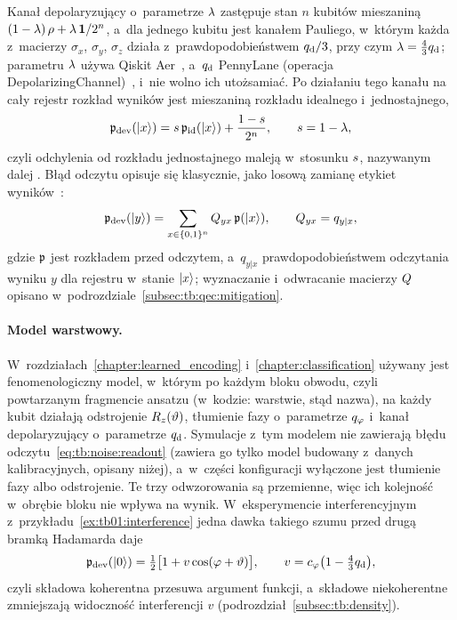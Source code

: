 Kanał depolaryzujący o~parametrze $\lambda$ zastępuje stan $n$ kubitów mieszaniną $(1-\lambda)\,\rho+\lambda\,\mathbf{1}/2^n$, a~dla jednego kubitu jest kanałem Pauliego, w~którym każda z~macierzy $\sigma_x$, $\sigma_y$, $\sigma_z$ działa z~prawdopodobieństwem $q_{\mathrm{d}}/3$, przy czym $\lambda=\tfrac{4}{3}q_{\mathrm{d}}$; parametru $\lambda$ używa Qiskit Aer~\cite{qiskit_aer_noise_docs_2026}, a~$q_{\mathrm{d}}$ PennyLane (operacja DepolarizingChannel)~\cite{bergholm_pennylane_2018}, i~nie wolno ich utożsamiać.
Po działaniu tego kanału na cały rejestr rozkład wyników jest mieszaniną rozkładu idealnego i~jednostajnego,
\begin{equation}\label{eq:tb:noise:shrink}
\mathfrak{p}_{\mathrm{dev}}(\ket{x})=s\,\mathfrak{p}_{\mathrm{id}}(\ket{x})+\frac{1-s}{2^n},\qquad s=1-\lambda,
\end{equation}
czyli odchylenia od rozkładu jednostajnego maleją w~stosunku $s$, nazywanym dalej .
Błąd odczytu opisuje się klasycznie, jako losową zamianę etykiet wyników~\cite{maciejewski_mitigation_2020}:
\begin{equation}\label{eq:tb:noise:readout}
\mathfrak{p}_{\mathrm{dev}}(\ket{y})=\sum_{x\in\{0,1\}^n}Q_{yx}\,\mathfrak{p}(\ket{x}),\qquad Q_{yx}=q_{y|x},
\end{equation}
gdzie $\mathfrak{p}$ jest rozkładem przed odczytem, a~$q_{y|x}$ prawdopodobieństwem odczytania wyniku $y$ dla rejestru w~stanie $\ket{x}$; wyznaczanie i~odwracanie macierzy $Q$ opisano w~podrozdziale~\ref{subsec:tb:qec:mitigation}.

\paragraph{Model warstwowy.}
W~rozdziałach~\ref{chapter:learned_encoding} i~\ref{chapter:classification} używany jest fenomenologiczny model, w~którym po każdym bloku obwodu, czyli powtarzanym fragmencie ansatzu (w~kodzie: warstwie, stąd nazwa), na każdy kubit działają odstrojenie $R_z(\vartheta)$, tłumienie fazy o~parametrze $q_{\varphi}$ i~kanał depolaryzujący o~parametrze $q_{\mathrm{d}}$.
Symulacje z~tym modelem nie zawierają błędu odczytu~\eqref{eq:tb:noise:readout} (zawiera go tylko model budowany z~danych kalibracyjnych, opisany niżej), a~w~części konfiguracji wyłączone jest tłumienie fazy albo odstrojenie.
Te trzy odwzorowania są przemienne, więc ich kolejność w~obrębie bloku nie wpływa na wynik.
W~eksperymencie interferencyjnym z~przykładu~\ref{ex:tb01:interference} jedna dawka takiego szumu przed drugą bramką Hadamarda daje
\begin{equation}\label{eq:tb:noise:fringe}
\mathfrak{p}_{\mathrm{dev}}(\ket{0})=\tfrac{1}{2}\bigl[1+v\cos(\varphi+\vartheta)\bigr],\qquad v=c_{\varphi}\bigl(1-\tfrac{4}{3}q_{\mathrm{d}}\bigr),
\end{equation}
czyli składowa koherentna przesuwa argument funkcji, a~składowe niekoherentne zmniejszają widoczność interferencji $v$ (podrozdział~\ref{subsec:tb:density}).

